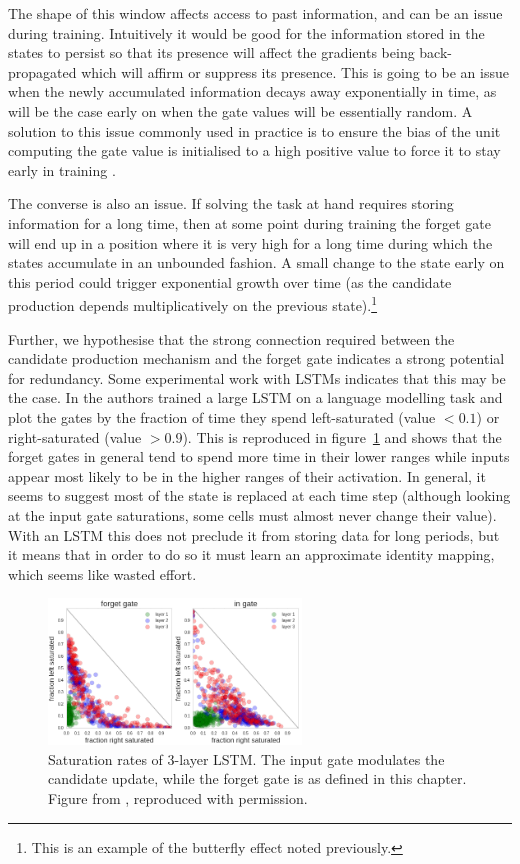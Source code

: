 The shape of this window affects access to past information, and can be an issue during training. 
Intuitively it would be good for the
information stored in the states to persist so that its presence will affect the gradients being
back-propagated which will affirm or suppress its presence. This is going to be an issue when
the newly accumulated information decays away exponentially in time, as will be the case early on
when the gate values will be essentially random. A solution to this issue commonly used in
practice is to ensure the bias of the unit computing the gate value 
is initialised to a high positive value to force it to stay early in
training \autocite{Jozefowicz2015}. 

The converse is also an issue. If solving the task at hand requires storing information
for a long time, then at some point during training the forget gate will end up in a position
where it is very high for a long time during which the states accumulate in an unbounded fashion.
A small change to the state early on this period could trigger exponential growth over time
(as the candidate production depends multiplicatively on the previous state).\footnote{
This is an example of the butterfly effect noted previously.}

Further, we hypothesise that the strong connection required between the candidate production
mechanism and the forget gate indicates a strong potential for redundancy. Some experimental work 
with LSTMs indicates that this may be the case.
In \autocite{Karpathy2016} the authors trained a large LSTM on a language modelling task and
plot the gates by the fraction of time they spend left-saturated (value \(<0.1\)) or 
right-saturated (value \(>0.9\)). 
This is reproduced in figure~\ref{fig:karpathy} and shows that the forget gates in general tend to spend
more time in their lower ranges while inputs appear most likely to be in the higher ranges of their
activation. In general, it seems to suggest most of the state is replaced at each time step (although
looking at the input gate saturations, some cells must almost never change their value). With an LSTM
this does not preclude it from storing data for long periods, but it means that in order to do so it
must learn an approximate identity mapping, which seems like wasted effort.

\begin{figure}
\centering
\includegraphics[width=0.6\textwidth]{newarchs/karpathy}
\caption[Saturations of 3-layer LSTM gates]{Saturation rates of 3-layer LSTM. The input gate modulates
the candidate update, while the forget gate is as defined in this chapter. Figure from
\autocite{Karpathy2016}, reproduced with permission.}
\label{fig:karpathy}
\end{figure}

